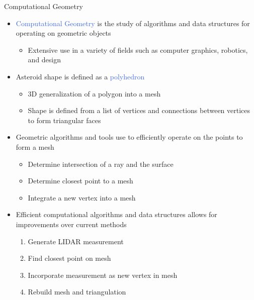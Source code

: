 \documentclass[final, usenames, dvipsnames]{beamer}
\newlength{\onecolwidth}
\def\Emph{\textcolor{RoyalBlue}}
\begin{document}
\begin{frame}[t]
\begin{columns}[T,onlytextwidth]
\begin{column}{\onecolwidth}
\begin{block}{Computational Geometry}
    \begin{itemize}
        \item \Emph{Computational Geometry} is the study of algorithms and data structures for operating on geometric objects
            \begin{itemize}
                \item Extensive use in a variety of fields such as computer graphics, robotics, and design 
            \end{itemize}
        \item Asteroid shape is defined as a \Emph{polyhedron}
        \begin{itemize}
            \item 3D generalization of a polygon into a mesh
            \item Shape is defined from a list of vertices and connections between vertices to form triangular faces
        \end{itemize}
    \item Geometric algorithms and tools use to efficiently operate on the points to form a mesh
        \begin{itemize}
            \item Determine intersection of a ray and the surface
            \item Determine closest point to a mesh
            \item Integrate a new vertex into a mesh
        \end{itemize}
    \item Efficient computational algorithms and data structures allows for improvements over current methods
        \begin{enumerate}
            \item Generate LIDAR measurement
            \item Find closest point on mesh
            \item Incorporate measurement as new vertex in mesh
            \item Rebuild mesh and triangulation
        \end{enumerate}
    \end{itemize}


\end{block}
\end{column}
\end{columns}
\end{frame}
\end{document}
